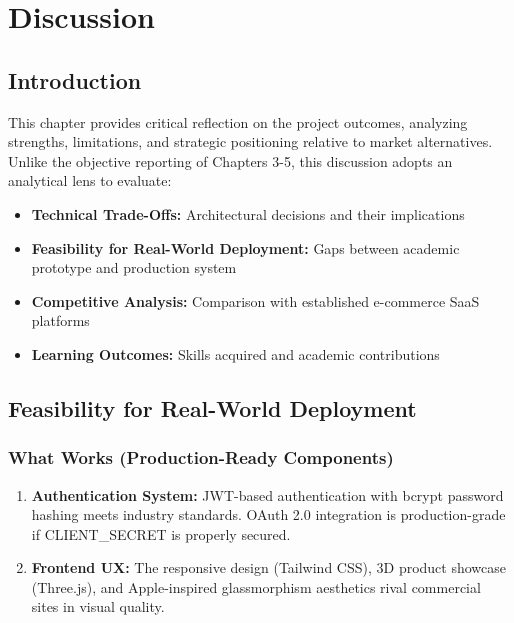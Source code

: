 \documentclass[12pt, a4paper]{report}
\begin{document}
{{%

\chapter{Discussion}

\section{Introduction}

This chapter provides critical reflection on the project outcomes, analyzing strengths, limitations, and strategic positioning relative to market alternatives. Unlike the objective reporting of Chapters 3-5, this discussion adopts an analytical lens to evaluate:

\begin{itemize}
    \item \textbf{Technical Trade-Offs:} Architectural decisions and their implications
    \item \textbf{Feasibility for Real-World Deployment:} Gaps between academic prototype and production system
    \item \textbf{Competitive Analysis:} Comparison with established e-commerce SaaS platforms
    \item \textbf{Learning Outcomes:} Skills acquired and academic contributions
\end{itemize}



\section{Feasibility for Real-World Deployment}

\subsection{What Works (Production-Ready Components)}

\begin{enumerate}
    \item \textbf{Authentication System:} JWT-based authentication with bcrypt password hashing meets industry standards. OAuth 2.0 integration is production-grade if CLIENT\_SECRET is properly secured.
    
    \item \textbf{Frontend UX:} The responsive design (Tailwind CSS), 3D product showcase (Three.js), and Apple-inspired glassmorphism aesthetics rival commercial sites in visual quality.
    

\end{enumerate}}}
\end{document}
